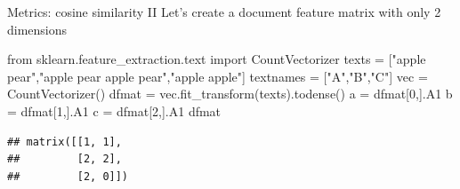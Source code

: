 \documentclass[
  10pt,
  ignorenonframetext,
  aspectratio=169]{beamer}
\newenvironment{Shaded}{\begin{snugshade}}{\end{snugshade}}
\newcommand{\DecValTok}[1]{\textcolor[rgb]{0.86,0.86,0.80}{#1}}
\newcommand{\ImportTok}[1]{\textcolor[rgb]{0.80,0.80,0.80}{#1}}
\newcommand{\NormalTok}[1]{\textcolor[rgb]{0.80,0.80,0.80}{#1}}
\newcommand{\OperatorTok}[1]{\textcolor[rgb]{0.94,0.94,0.82}{#1}}
\newcommand{\StringTok}[1]{\textcolor[rgb]{0.80,0.58,0.58}{#1}}
\begin{document}
\begin{frame}[fragile]{Metrics: cosine similarity II}
\protect\hypertarget{metrics-cosine-similarity-ii}{}
Let's create a document feature matrix with only 2 dimensions

\begin{Shaded}
\begin{Highlighting}[]
\ImportTok{from}\NormalTok{ sklearn.feature\_extraction.text }\ImportTok{import}\NormalTok{ CountVectorizer}
\NormalTok{texts }\OperatorTok{=}\NormalTok{ [}\StringTok{"apple pear"}\NormalTok{,}\StringTok{"apple pear apple pear"}\NormalTok{,}\StringTok{"apple apple"}\NormalTok{]}
\NormalTok{textnames }\OperatorTok{=}\NormalTok{ [}\StringTok{"A"}\NormalTok{,}\StringTok{"B"}\NormalTok{,}\StringTok{"C"}\NormalTok{]}
\NormalTok{vec }\OperatorTok{=}\NormalTok{ CountVectorizer()}
\NormalTok{dfmat }\OperatorTok{=}\NormalTok{ vec.fit\_transform(texts).todense()}
\NormalTok{a }\OperatorTok{=}\NormalTok{ dfmat[}\DecValTok{0}\NormalTok{,].A1}
\NormalTok{b }\OperatorTok{=}\NormalTok{ dfmat[}\DecValTok{1}\NormalTok{,].A1}
\NormalTok{c }\OperatorTok{=}\NormalTok{ dfmat[}\DecValTok{2}\NormalTok{,].A1}
\NormalTok{dfmat}
\end{Highlighting}
\end{Shaded}

\begin{verbatim}
## matrix([[1, 1],
##         [2, 2],
##         [2, 0]])
\end{verbatim}
\end{frame}
\end{document}
